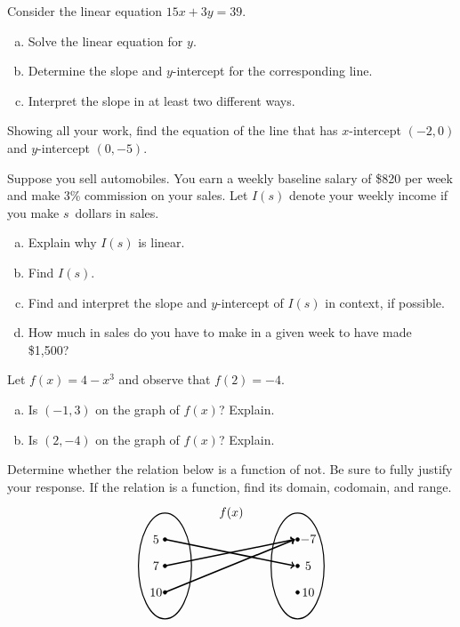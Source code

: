 \documentclass[11pt,letterpaper]{article}
\begin{document}
\prob Consider the linear equation $15x + 3y= 39$. 
        \begin{enumerate}[(a)]
        \item Solve the linear equation for $y$. 
        \item Determine the slope and $y$-intercept for the corresponding line.
        \item Interpret the slope in at least two different ways. 
        \end{enumerate} \pspace


\prob Showing all your work, find the equation of the line that has $x$-intercept $(-2, 0)$ and $y$-intercept $(0, -5)$. \pspace 


\prob Suppose you sell automobiles. You earn a weekly baseline salary of \$820 per week and make 3\% commission on your sales. Let $I(s)$ denote your weekly income if you make $s$~dollars in sales. 
	\begin{enumerate}[(a)]
	\item Explain why $I(s)$ is linear. 
	\item Find $I(s)$.
	\item Find and interpret the slope and $y$-intercept of $I(s)$ in context, if possible. 
	\item How much in sales do you have to make in a given week to have made \$1,500?
	\end{enumerate} \pspace	


\prob Let $f(x)= 4 - x^3$ and observe that $f(2)= -4$. 
	\begin{enumerate}[(a)]
	\item Is $(-1, 3)$ on the graph of $f(x)$? Explain. 
	\item Is $(2, -4)$ on the graph of $f(x)$? Explain. 
	\end{enumerate} \pspace


\prob Determine whether the relation below is a function of not. Be sure to fully justify your response. If the relation is a function, find its domain, codomain, and range. 
	\[
	\begin{tikzpicture}[scale=0.75]
	\node at (2.5,2) {$f(x)$};
	\draw[line width=0.03cm] (0,0) circle (1 and 2);
	\draw[line width=0.03cm] (5,0) circle (1 and 2);
	
	\draw[fill=black] (0,1) circle (0.07);
	\draw[fill=black] (0,0) circle (0.07);
	\draw[fill=black] (0,-1) circle (0.07);
	
	\draw[fill=black] (5,1) circle (0.07);
	\draw[fill=black] (5,0) circle (0.07);
	\draw[fill=black] (5,-1) circle (0.07);
	
	\draw[line width=0.04cm,->] (0,1) -- (4.9,0);
	\draw[line width=0.04cm,->] (0,0) -- (4.9,1);
	\draw[line width=0.04cm,->] (0,-1) -- (4.9,1);
	
	\node at (-0.3,1) {$5\,$};
	\node at (-0.3,0) {$7\,$};
	\node at (-0.3,-1) {$10\,$};
	
	\node at (5.4,1) {$-7$};
	\node at (5.4,0) {$5$};
	\node at (5.4,-1) {$10$};
	\end{tikzpicture}
	\] \pspace
\end{document}
